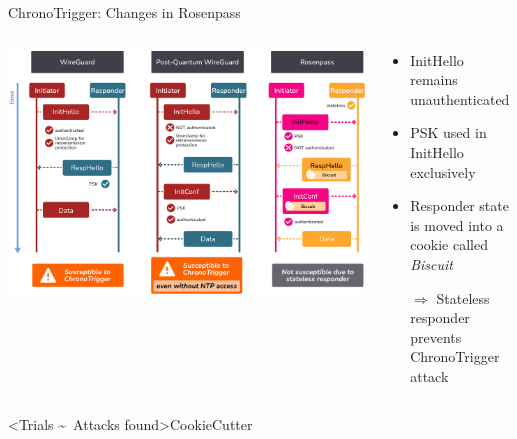 \begin{frame}{ChronoTrigger: Changes in Rosenpass}
  \begin{columns}[fullwidth,c]
    \begin{column}{.64\linewidth}
      \includegraphics[keepaspectratio,width=\linewidth]{graphics/chronotrigger-compare.pdf}
    \end{column}%
    \begin{column}{.3\linewidth}
      \begin{itemize}
        \item InitHello remains unauthenticated
        \item PSK used in InitHello exclusively
        \item Responder state is moved into a cookie called \emph{Biscuit}
        \item[$\Rightarrow$] Stateless responder prevents ChronoTrigger attack
      \end{itemize}
    \end{column}
  \end{columns}
\end{frame}

\interlude[3]<Trials \textasciitilde\ Attacks found>{CookieCutter}

